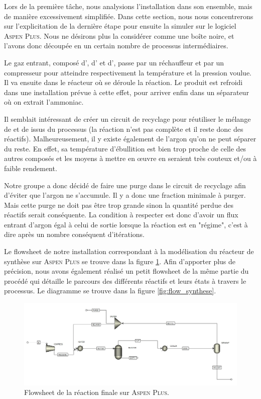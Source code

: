 Lors de la première tâche, nous analysions l'installation dans son ensemble, 
mais de manière excessivement simplifiée. 
Dans cette section, nous nous concentrerons sur l'explicitation de la dernière étape 
pour ensuite la simuler sur le logiciel \textsc{Aspen Plus}. 
Nous ne désirons plus la considérer comme une boîte noire, et l'avons donc découpée 
en un certain nombre de processus intermédiaires. 

Le gaz entrant, composé d', d' et d', passe par un réchauffeur 
et par un compresseur pour atteindre respectivement la température et la pression voulue. 
Il va ensuite dans le réacteur où se déroule la réaction.
Le produit est refroidi dans une installation prévue à cette effet, 
pour arriver enfin dans un séparateur où on extrait l'ammoniac.

Il semblait intéressant de créer un circuit de recyclage pour réutiliser 
le mélange de  et de  issus du processus (la réaction n'est pas complète 
et il reste donc des réactifs). Malheureusement, il y existe également de l'argon 
qu'on ne peut séparer du reste. En effet, sa température d'ébullition est bien trop 
proche de celle des autres composés et les moyens à mettre en œuvre en seraient 
très couteux et/ou à faible rendement.

Notre groupe a donc décidé de faire une purge dans le circuit de recyclage afin d'éviter que l'argon ne s'accumule. Il y a donc une fraction minimale à purger. Mais cette purge ne doit pas être trop grande sinon la quantité perdue des réactifs serait conséquente. 
La condition à respecter est donc d'avoir un flux entrant d'argon égal à celui de sortie lorsque la réaction est en "régime", c'est à dire après un nombre conséquent d'itérations.

Le flowsheet de notre installation correspondant à la modélisation 
du réacteur de synthèse sur \textsc{Aspen Plus} 
se trouve dans la figure \ref{fig:flow_aspen}.
Afin d'apporter plus de précision, nous avons également réalisé un petit 
flowsheet de la même partie du procédé qui détaille le parcours des 
différents réactifs et leurs états à travers le processus.
Le diagramme se trouve dans la figure \ref{fig:flow_synthese}.

\begin{figure}[h!]
	\begin{center}
		\includegraphics[scale=0.45,angle=90]{../tache2/img_aspen/flowsheet.jpg}
	\end{center}
	\caption{Flowsheet de la réaction finale sur \textsc{Aspen Plus}.}
	\label{fig:flow_aspen}
\end{figure}

